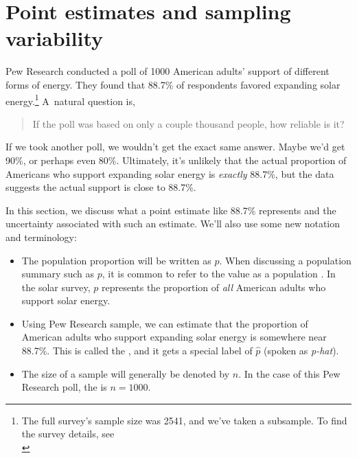 \section{Point estimates and sampling variability}
\label{pointEstimates}


\newcommand{\pewsolarpollsize}{1000}
\newcommand{\pewsolarpollprop}{0.887}
\newcommand{\pewsolarpollpropcomplement}{0.113}
\newcommand{\pewsolarpollpercent}{88.7}
\newcommand{\pewsolarpollpercentcomplement}{11.3}
\newcommand{\pewsolarpollcount}{887}
\newcommand{\pewsolarpollcountcomplement}{113}
\newcommand{\pewsolarpollse}{0.0100}

Pew Research conducted a poll of 1000
American adults' support of different forms of energy.
They found that \pewsolarpollpercent{}\% of respondents
favored expanding
solar energy.\footnote{The full survey's sample size was 2541,
and we've taken a subsample. To find the survey details, see\\
}
A~natural question is,
\begin{quote}
If the poll was based on only a couple thousand people, how reliable is it?
\end{quote}
If we took another poll, we wouldn't get the exact same answer.
Maybe we'd get 90\%, or perhaps even 80\%.
Ultimately, it's unlikely that the actual proportion of Americans
who support expanding solar energy is \emph{exactly}
\pewsolarpollpercent{}\%, but the data suggests the actual
support is close to \pewsolarpollpercent{}\%.

In this section, we discuss what a point estimate like
\pewsolarpollpercent{}\% represents
and the uncertainty associated with such an estimate. We'll also
use some new notation and terminology:
\begin{itemize}
\item The population proportion will be written as $p$.
    When discussing a population summary such as $p$,
    it is common to refer to the value as a population
    .
    In the solar survey,
    $p$ represents the proportion of \emph{all}
    American adults who support solar energy.
\item Using Pew Research sample, we can estimate that the proportion
    of American adults who support expanding solar energy is
    somewhere near \pewsolarpollpercent{}\%.
    This is called the ,
    and it gets a special label of $\hat{p}$
    (spoken as \emph{p-hat}).
\item The size of a sample will generally
    be denoted by $n$. In the case of this Pew Research poll,
    the  is $n = \pewsolarpollsize{}$.
\end{itemize}

